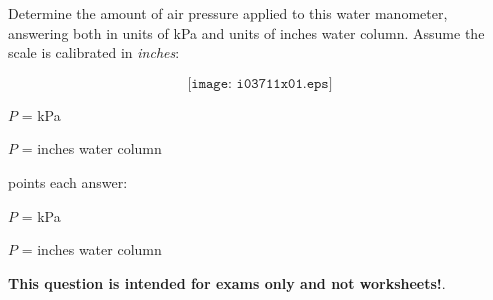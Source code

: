 

Determine the amount of air pressure applied to this water manometer, answering both in units of kPa and units of inches water column.  Assume the scale is calibrated in {\it inches}:

$$\texttt{[image: i03711x01.eps]}$$

$P$ = \underbar{\hskip 50pt} kPa

\vskip 10pt

$P$ = \underbar{\hskip 50pt} inches water column







 points each answer:

\vskip 10pt

$P$ =  kPa

\vskip 10pt

$P$ =  inches water column








{\bf This question is intended for exams only and not worksheets!}.



